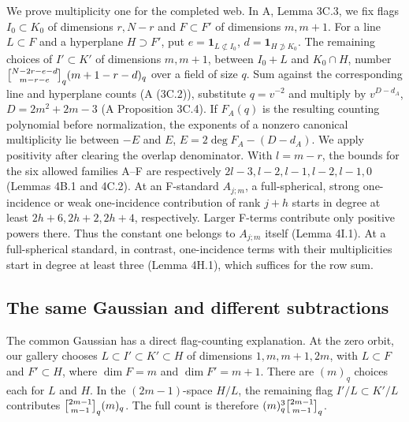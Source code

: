 We prove multiplicity one for the completed web. In A, Lemma 3C.3, we fix flags \(I_0\subset K_0\) of dimensions \(r,N-r\) and \(F\subset F'\) of dimensions \(m,m+1\). For a line \(L\subset F\) and a hyperplane \(H\supset F'\), put \(e=\mathbf1_{L\not\subset I_0}\), \(d=\mathbf1_{H\not\supset K_0}\). The remaining choices of \(I'\subset K'\) of dimensions \(m,m+1\), between \(I_0+L\) and \(K_0\cap H\), number
\(
 \gb{N-2r-e-d}{m-r-e}_q(m+1-r-d)_q
\)
over a field of size \(q\). Sum against the corresponding line and hyperplane counts (A (3C.2)), substitute \(q=v^{-2}\) and multiply by \(v^{D-d_A}\), \(D=2m^2+2m-3\) (A Proposition 3C.4). If \(F_A(q)\) is the resulting counting polynomial before normalization, the exponents of a nonzero canonical multiplicity lie between \(-E\) and \(E\), \(E=2\deg F_A-(D-d_A)\). We apply positivity after clearing the overlap denominator. With \(l=m-r\), the bounds for the six allowed families A--F are respectively \(2l-3,l-2,l-1,l-2,l-1,0\) (Lemmas 4B.1 and 4C.2). At an F-standard \(A_{j;m}\), a full-spherical, strong one-incidence or weak one-incidence contribution of rank \(j+h\) starts in degree at least \(2h+6,2h+2,2h+4\), respectively. Larger F-terms contribute only positive powers there. Thus the constant one belongs to \(A_{j;m}\) itself (Lemma 4I.1). At a full-spherical standard, in contrast, one-incidence terms with their multiplicities start in degree at least three (Lemma 4H.1), which suffices for the row sum.

\newpage\subsection*{The same Gaussian and different subtractions}
The common Gaussian has a direct flag-counting explanation.
At the zero orbit, our gallery chooses
$L\subset I'\subset K'\subset H$ of dimensions $1,m,m+1,2m$,
with $L\subset F$ and $F'\subset H$, where
$\dim F=m$ and $\dim F'=m+1$.
There are $(m)_q$ choices each for $L$ and $H$.
In the $(2m-1)$-space $H/L$, the remaining flag
$I'/L\subset K'/L$ contributes
$\gb{2m-1}{m-1}_q(m)_q$.
The full count is therefore $(m)_q^3\gb{2m-1}{m-1}_q$.

